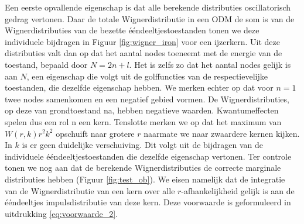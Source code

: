 \documentclass[11pt,twoside]{book}
\begin{document}
Een eerste opvallende eigenschap is dat alle berekende distributies oscillatorisch gedrag vertonen. Daar de totale Wignerdistributie in een ODM de som is van de Wignerdistributies van de bezette \'{e}\'{e}ndeeltjestoestanden tonen we deze individuele bijdragen in Figuur \ref{fig:wigner_iron} voor een ijzerkern. Uit deze distributies valt dan op dat het aantal nodes toeneemt met de energie van de toestand, bepaald door $N=2n+l$. Het is zelfs zo dat het aantal nodes gelijk is aan $N$, een eigenschap die volgt uit de golffuncties van de respectievelijke toestanden, die dezelfde eigenschap hebben. We merken echter op dat voor $n=1$ twee nodes samenkomen en een negatief gebied vormen.
De Wignerdistributies, op deze van grondtoestand na, hebben negatieve waarden. Kwantumeffecten spelen dus een rol n een kern.
Tenslotte merken we op dat het maximum van $W(r,k)r^2 k^2$ opschuift naar grotere $r$ naarmate we naar zwaardere kernen kijken. In $k$ is er geen duidelijke verschuiving. Dit volgt uit de bijdragen van de individuele \'{e}\'{e}ndeeltjestoestanden die dezelfde eigenschap vertonen.
Ter controle tonen we nog aan dat de berekende Wignerdistributies de correcte marginale distributies hebben (Figuur \ref{fig:test_ob}). We eisen namelijk dat de integratie van de  Wignerdistributie van een kern over alle $r$-afhankelijkheid gelijk is aan de \'{e}\'{e}ndeeltjes impulsdistributie van deze kern. Deze voorwaarde is geformuleerd in uitdrukking \eqref{eq:voorwaarde_2}.
\end{document}
